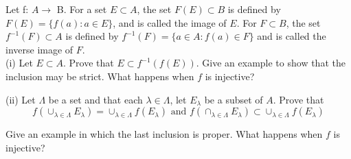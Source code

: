 \documentclass[addpoints]{exam}
\begin{document}
\begin{questions}
\question Let f: $A \rightarrow$ B. For a set $E \subset A$, the set $F(E) \subset B$ is defined by $F(E) = \{f(a): a \in E\}$, and 
is called the image of $E$. For $F \subset B$, the set $f^{-1}(F) \subset A$ is defined by $f^{-1}(F) = \{a \in A: f(a) \in F\}$ and is 
called the inverse image of $F$. \\
(i) Let $E \subset A$. Prove that $E \subset f^{-1}(f(E))$. Give an example to show that the inclusion may be strict. 
What happens when $f$ is injective? 

(ii) Let $\Lambda$ be a set and that each $\lambda \in \Lambda$, let $E_{\lambda}$ be a subset of $A$. Prove that 
\[f(\cup_{\lambda \in \Lambda}E_{\lambda}) = \cup_{\lambda \in \Lambda} f(E_\lambda) \text{ and } f(\cap_{\lambda \in \Lambda}E_{\lambda})
\subset \cup_{\lambda \in \Lambda}f(E_\lambda)\]

Give an example in which the last inclusion is proper. What happens when $f$ is injective?

\end{questions}
\end{document}
